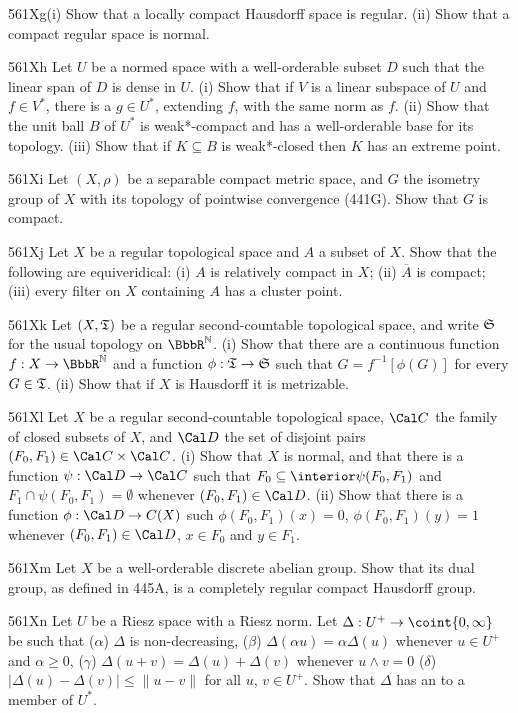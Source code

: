 {\spheader 561Xg(i) Show that a locally compact Hausdorff space is regular.
(ii) Show that a compact regular space is normal.

\spheader 561Xh Let $U$ be a normed space with a well-orderable subset $D$
such that the linear span of $D$ is dense in $U$.
(i) Show that if $V$ is a
linear subspace of $U$ and $f\in V^*$, there is a $g\in U^*$, extending
$f$, with the same norm as $f$.   (ii) Show that the unit ball
$B$ of $U^*$ is
weak*-compact and has a well-orderable base for its topology.   (iii) Show
that if $K\subseteq B$ is weak*-closed then $K$ has an extreme point.

\spheader 561Xi Let $(X,\rho)$ be a separable
compact metric space, and $G$ the
isometry group of $X$ with its topology of pointwise convergence (441G).
Show that $G$ is compact.   

\spheader 561Xj Let $X$ be a regular topological space and $A$ a subset of
$X$.   Show that the following are equiveridical:  (i) $A$ is relatively
compact in $X$;  (ii) $\overline{A}$ is compact;  (iii) every filter on $X$
containing $A$ has a cluster point.

\sqheader 561Xk Let $(X,\frak T)$ be a regular second-countable
topological space, and write $\frak S$ for the usual topology on
$\BbbR^{\Bbb N}$.   (i) Show that there are a continuous function
$f:X\to\BbbR^{\Bbb N}$ and a function $\phi:\frak T\to\frak S$ such that
$G=f^{-1}[\phi(G)]$ for every $G\in\frak T$.   (ii) Show that if $X$ is
Hausdorff it is metrizable.

\sqheader 561Xl Let $X$ be a regular second-countable topological space,
$\Cal C$ the family of closed subsets of $X$, and $\Cal D$ the set of
disjoint pairs
$(F_0,F_1)\in\Cal C\times\Cal C$.   (i) Show that $X$ is
normal, and that there
is a function $\psi:\Cal D\to\Cal C$ such that
$F_0\subseteq\interior\psi(F_0,F_1)$ and $F_1\cap\psi(F_0,F_1)=\emptyset$
whenever $(F_0,F_1)\in\Cal D$.
(ii) Show that there is a function $\phi:\Cal D\to C(X)$ such
$\phi(F_0,F_1)(x)=0$, $\phi(F_0,F_1)(y)=1$ whenever $(F_0,F_1)\in\Cal D$,
$x\in F_0$ and $y\in F_1$.

\spheader 561Xm Let $X$ be a well-orderable discrete abelian group.   Show
that its dual group, as defined in 445A, is a completely regular compact
Hausdorff group.

\spheader 561Xn Let $U$ be a Riesz space with a Riesz norm.   Let
$\Delta:U^+\to\coint{0,\infty}$ be such that
($\alpha$) $\Delta$ is non-decreasing,
($\beta$) $\Delta(\alpha u)=\alpha\Delta(u)$ whenever
$u\in U^+$ and $\alpha\ge 0$,
($\gamma$) $\Delta(u+v)=\Delta(u)+\Delta(v)$ whenever $u\wedge v=0$
($\delta$) $|\Delta(u)-\Delta(v)|\le\|u-v\|$ for all $u$, $v\in U^+$.
Show that $\Delta$ has an  to a member of $U^*$.

}
